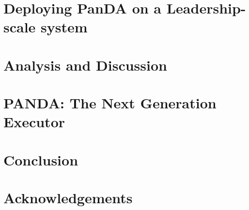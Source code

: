 \documentclass[10pt, conference, compsocconf]{IEEEtran}
\begin{document}
\section{Deploying PanDA on a Leadership-scale system}
\label{sec:panda_deployment}




\section{Analysis and Discussion}
\label{sec:panda_titan}




\section{PANDA\@: The Next Generation Executor}
\label{sec:panda_roadmap}





\section{Conclusion}
\label{sec:conclusion}




\section*{Acknowledgements}
\label{sec:ack}







\end{document}
